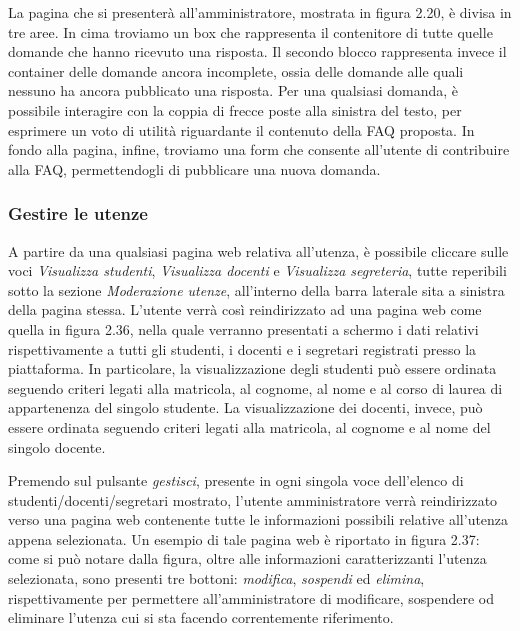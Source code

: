 \documentclass [a4paper,11pt]{book}
\begin{document}
La pagina che si presenterà all'amministratore, mostrata in figura 2.20, è divisa in tre aree. In cima troviamo un box che rappresenta il contenitore di tutte quelle domande che hanno ricevuto una risposta. Il secondo blocco rappresenta invece il container delle domande ancora incomplete, ossia delle domande alle quali nessuno ha ancora pubblicato una risposta. Per una qualsiasi domanda, è possibile interagire con la coppia di frecce poste alla sinistra del testo, per esprimere un voto di utilità riguardante il contenuto della FAQ proposta. In fondo alla pagina, infine, troviamo una form che consente all'utente di contribuire alla FAQ, permettendogli di pubblicare una nuova domanda. 

\medskip

\subsubsection{Gestire le utenze}	

A partire da una qualsiasi pagina web relativa all'utenza, è possibile cliccare sulle voci \emph{Visualizza studenti}, \emph{Visualizza docenti} e \emph{Visualizza segreteria}, tutte reperibili sotto la sezione \emph{Moderazione utenze}, all'interno della barra laterale sita a sinistra della pagina stessa. L'utente verrà così reindirizzato ad una pagina web come quella in figura 2.36, nella quale verranno presentati a schermo i dati relativi rispettivamente a tutti gli studenti, i docenti e i segretari registrati presso la piattaforma. In particolare, la visualizzazione degli studenti può essere ordinata seguendo criteri legati alla matricola, al cognome, al nome e al corso di laurea di appartenenza del singolo studente. La visualizzazione dei docenti, invece, può essere ordinata seguendo criteri legati alla matricola, al cognome e al nome del singolo docente.


Premendo sul pulsante \emph{gestisci}, presente in ogni singola voce dell'elenco di studenti/docenti/segretari mostrato, l'utente amministratore verrà reindirizzato verso una pagina web contenente tutte le informazioni possibili relative all'utenza appena selezionata. Un esempio di tale pagina web è riportato in figura 2.37: come si può notare dalla figura, oltre alle informazioni caratterizzanti l'utenza selezionata, sono presenti tre bottoni: \emph{modifica}, \emph{sospendi} ed \emph{elimina}, rispettivamente per permettere all'amministratore di modificare, sospendere od eliminare l'utenza cui si sta facendo correntemente riferimento.
\end{document}

